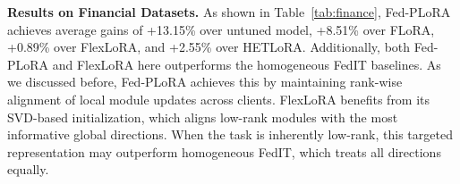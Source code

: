 \documentclass{article} %
\begin{document}
\begin{table}[t]
  \centering
  \renewcommand{\arraystretch}{1.4}   
  \vspace{-8pt}
  \caption{Comparison of Fed-PLoRA with baselines on financial datasets.}
  \label{tab:finance}
  \vspace{-22pt}
\end{table}

\noindent\textbf{Results on Financial Datasets.} As shown in Table~\ref{tab:finance}, Fed-PLoRA achieves average gains of {+13.15\% over untuned model,} +8.51\% over FLoRA, +0.89\% over FlexLoRA, and +2.55\% over HETLoRA. Additionally, both Fed-PLoRA and FlexLoRA here outperforms the homogeneous FedIT baselines. As we discussed before, Fed-PLoRA achieves this by maintaining rank-wise alignment of local module updates across clients. FlexLoRA benefits from its SVD-based initialization, which aligns low-rank modules with the most informative global directions. When the task is inherently low-rank, this targeted representation may outperform homogeneous FedIT, which treats all directions equally. 
\end{document}
